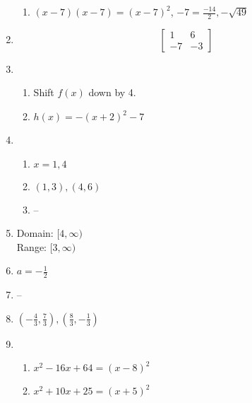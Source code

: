 \documentclass{article}
\begin{document}
\begin{enumerate}
\begin{enumerate}
	\item $(x - 7)(x - 7) = (x - 7)^2$, $-7 = \frac{-14}{2}, -\sqrt{49}$
	
	\end{enumerate}
	
\item 
	\begin{equation*}
	\begin{bmatrix}
	1 & 6 \\
	-7 & -3
	\end{bmatrix}
	\end{equation*}
	
\item

	\begin{enumerate}
	
	\item Shift $f(x)$ down by 4.

	\item $h(x) = -(x + 2)^2 - 7$
	
	\end{enumerate}
	
\item

	\begin{enumerate}
	
	\item $x = 1, 4$
	
	\item $(1, 3), (4, 6)$
	
	\item --
	
	\end{enumerate}
	
\item Domain: $[4, \infty)$ \\
	Range: $[3, \infty)$
	
\item $a = -\frac{1}{2}$

\item --

\item $(-\frac{4}{3}, \frac{7}{3}), (\frac{8}{3}, -\frac{1}{3})$

\item

	\begin{enumerate}
	
	\item $x^2 - 16x + 64 = (x - 8)^2$
	
	\item $x^2 + 10x + 25 = (x + 5)^2$
	

\end{enumerate}
\end{enumerate}
\end{document}
